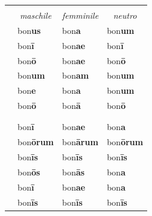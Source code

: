 \documentclass[nols]{tufte-handout}
\newcommand{\nom}{\textsc{nom}\xspace}
\newcommand{\gen}{\textsc{gen}\xspace}
\newcommand{\dat}{\textsc{dat}\xspace}
\newcommand{\acc}{\textsc{acc}\xspace}
\newcommand{\voc}{\textsc{voc}\xspace}
\newcommand{\abl}{\textsc{abl}\xspace}
\newcommand{\textls}[2][5]{%
    \begingroup\addfontfeatures{LetterSpace=#1}#2\endgroup
  }
\renewcommand{\smallcapsspacing}[1]{\textls[10]{#1}}
\renewcommand{\textsc}[1]{\smallcapsspacing{\textsmallcaps{#1}}}
\begin{document}
\begin{fullwidth}
\begin{table}[!htbp]
  \centering
  \begin{tabular}{l l l l}
	& \multicolumn{3}{c}{\textsc{Singolare}} \\
	
	& \multicolumn{1}{c}{\textit{maschile}} & \multicolumn{1}{c}{\textit{femminile}} & \multicolumn{1}{c}{\textit{neutro}} \\ 
	
    \nom & bon\textbf{us} & bon\textbf{a} & bon\textbf{um} \\
    \gen & bon\textbf{ī} & bon\textbf{ae} & bon\textbf{ī} \\
    \dat & bon\textbf{ō} & bon\textbf{ae} & bon\textbf{ō} \\
    \acc & bon\textbf{um} & bon\textbf{am} & bon\textbf{um} \\
    \voc & bon\textbf{e} & bon\textbf{a} & bon\textbf{um} \\
    \abl & bon\textbf{ō} & bon\textbf{ā} & bon\textbf{ō} \\
	
	\multicolumn{4}{c}{\textemdash} \\
	
	& \multicolumn{3}{c}{\textsc{Plurale}} \\

    \nom & bon\textbf{ī}  & bon\textbf{ae} & bon\textbf{a} \\
    \gen & bon\textbf{ōrum} & bon\textbf{ārum} & bon\textbf{ōrum}  \\
    \dat & bon\textbf{īs} & bon\textbf{īs} & bon\textbf{īs} \\
    \acc & bon\textbf{ōs} & bon\textbf{ās} & bon\textbf{a}  \\
    \voc & bon\textbf{ī} & bon\textbf{ae} & bon\textbf{a}  \\
    \abl & bon\textbf{īs} & bon\textbf{īs} & bon\textbf{īs}  \\
	
  \end{tabular}
  \label{tab:normaltab}
\end{table}
\end{fullwidth}
\end{document}
